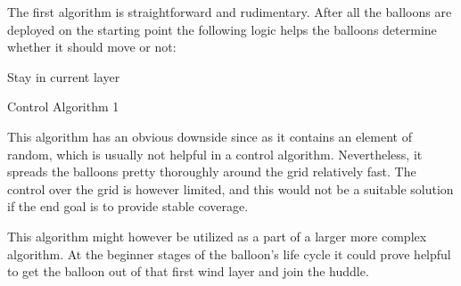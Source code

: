 The first algorithm is straightforward and rudimentary. After all the balloons are deployed on the starting point the following logic helps the balloons determine whether it should move or not:

\begin{algorithm}[H]
 \Else
 {Stay in current layer}
 \caption{Control Algorithm 1}
 \label{alg1}
\end{algorithm}

This algorithm has an obvious downside since as it contains an element of random, which is usually not helpful in a control algorithm. Nevertheless, it spreads the balloons pretty thoroughly around the grid relatively fast. The control over the grid is however limited, and this would not be a suitable solution if the end goal is to provide stable coverage.

This algorithm might however be utilized as a part of a larger more complex algorithm. At the beginner stages of the balloon's life cycle it could prove helpful to get the balloon out of that first wind layer and join the huddle.  